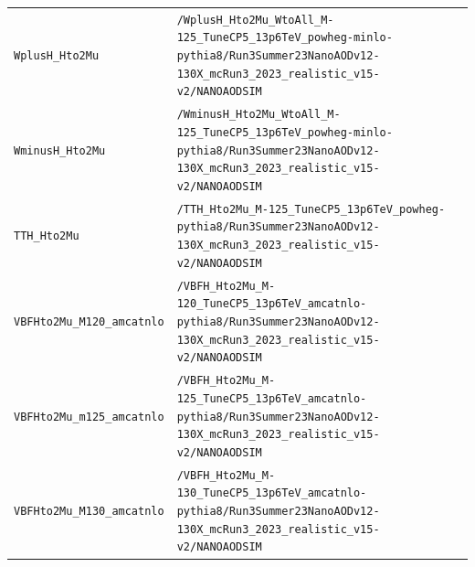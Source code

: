 \begin{longtable}{@{}>{\RaggedRight\arraybackslash}p{} >{\RaggedRight\arraybackslash}p{}@{}}
\addlinespace[2pt]
\texttt{WplusH\_\allowbreak{}Hto2Mu} & \texttt{/\allowbreak{}WplusH\_\allowbreak{}Hto2Mu\_\allowbreak{}WtoAll\_\allowbreak{}M-\allowbreak{}125\_\allowbreak{}TuneCP5\_\allowbreak{}13p6TeV\_\allowbreak{}powheg-\allowbreak{}minlo-\allowbreak{}pythia8/\allowbreak{}Run3Summer23NanoAODv12-\allowbreak{}130X\_\allowbreak{}mcRun3\_\allowbreak{}2023\_\allowbreak{}realistic\_\allowbreak{}v15-\allowbreak{}v2/\allowbreak{}NANOAODSIM} \\
\addlinespace[2pt]
\texttt{WminusH\_\allowbreak{}Hto2Mu} & \texttt{/\allowbreak{}WminusH\_\allowbreak{}Hto2Mu\_\allowbreak{}WtoAll\_\allowbreak{}M-\allowbreak{}125\_\allowbreak{}TuneCP5\_\allowbreak{}13p6TeV\_\allowbreak{}powheg-\allowbreak{}minlo-\allowbreak{}pythia8/\allowbreak{}Run3Summer23NanoAODv12-\allowbreak{}130X\_\allowbreak{}mcRun3\_\allowbreak{}2023\_\allowbreak{}realistic\_\allowbreak{}v15-\allowbreak{}v2/\allowbreak{}NANOAODSIM} \\
\addlinespace[2pt]
\texttt{TTH\_\allowbreak{}Hto2Mu} & \texttt{/\allowbreak{}TTH\_\allowbreak{}Hto2Mu\_\allowbreak{}M-\allowbreak{}125\_\allowbreak{}TuneCP5\_\allowbreak{}13p6TeV\_\allowbreak{}powheg-\allowbreak{}pythia8/\allowbreak{}Run3Summer23NanoAODv12-\allowbreak{}130X\_\allowbreak{}mcRun3\_\allowbreak{}2023\_\allowbreak{}realistic\_\allowbreak{}v15-\allowbreak{}v2/\allowbreak{}NANOAODSIM} \\
\addlinespace[2pt]
\texttt{VBFHto2Mu\_\allowbreak{}M120\_\allowbreak{}amcatnlo} & \texttt{/\allowbreak{}VBFH\_\allowbreak{}Hto2Mu\_\allowbreak{}M-\allowbreak{}120\_\allowbreak{}TuneCP5\_\allowbreak{}13p6TeV\_\allowbreak{}amcatnlo-\allowbreak{}pythia8/\allowbreak{}Run3Summer23NanoAODv12-\allowbreak{}130X\_\allowbreak{}mcRun3\_\allowbreak{}2023\_\allowbreak{}realistic\_\allowbreak{}v15-\allowbreak{}v2/\allowbreak{}NANOAODSIM} \\
\addlinespace[2pt]
\texttt{VBFHto2Mu\_\allowbreak{}m125\_\allowbreak{}amcatnlo} & \texttt{/\allowbreak{}VBFH\_\allowbreak{}Hto2Mu\_\allowbreak{}M-\allowbreak{}125\_\allowbreak{}TuneCP5\_\allowbreak{}13p6TeV\_\allowbreak{}amcatnlo-\allowbreak{}pythia8/\allowbreak{}Run3Summer23NanoAODv12-\allowbreak{}130X\_\allowbreak{}mcRun3\_\allowbreak{}2023\_\allowbreak{}realistic\_\allowbreak{}v15-\allowbreak{}v2/\allowbreak{}NANOAODSIM} \\
\addlinespace[2pt]
\texttt{VBFHto2Mu\_\allowbreak{}M130\_\allowbreak{}amcatnlo} & \texttt{/\allowbreak{}VBFH\_\allowbreak{}Hto2Mu\_\allowbreak{}M-\allowbreak{}130\_\allowbreak{}TuneCP5\_\allowbreak{}13p6TeV\_\allowbreak{}amcatnlo-\allowbreak{}pythia8/\allowbreak{}Run3Summer23NanoAODv12-\allowbreak{}130X\_\allowbreak{}mcRun3\_\allowbreak{}2023\_\allowbreak{}realistic\_\allowbreak{}v15-\allowbreak{}v2/\allowbreak{}NANOAODSIM} \\

\end{longtable}
